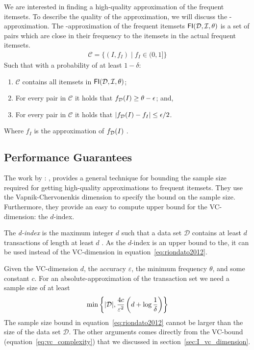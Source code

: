 \documentclass[../main.tex]{subfiles}
\begin{document}
We are interested in finding a high-quality approximation of the frequent itemsets.
To describe the quality of the approximation, we will discuss the \FIapprox-approximation.
The \FIapprox-approximation of the frequent itemsets $\mathsf{FI}(\mathcal{D}, \mathcal{I}, \theta)$ is a set of pairs
which are close in their frequency to the itemsets in the actual frequent itemsets.
\begin{align}
    \mathcal{C} = \{ (I, f_I) \mid f_I \in (0,1] \}
\end{align}
Such that with a probability of at least $1 - \delta$:
\begin{enumerate}[noitemsep]
    \item $\mathcal{C}$ contains all itemsets in $\mathsf{FI}(\mathcal{D}, \mathcal{I}, \theta)$;
    \item For every pair in $\mathcal{C}$ it holds that $f_{\mathcal{D}}(I) \ge \theta - \epsilon$; and,
    \item For every pair in $\mathcal{C}$ it holds that $\lvert f_{\mathcal{D}}(I) - f_I\rvert \le \epsilon/2$.
\end{enumerate}
Where $f_I$ is the approximation of $f_{\mathcal{D}}(I)$
\cite{Riondato2015}.


\subsection{Performance Guarantees}
\label{sec:I_performance_guarantees}

The work by \citeauthor{Riondato2012} \cite{Riondato2012}: ,
provides a general technique for bounding the sample size required for getting high-quality approximations to frequent itemsets.
They use the Vapnik-Chervonenkis dimension to specify the bound on the sample size. 
Furthermore, they provide an easy to compute upper bound for the VC-dimension: the $d$-index.

The \emph{d-index} is the maximum integer $d$ such that a data set $\mathcal{D}$ contains at least $d$ transactions
of length at least $d$ \cite{Riondato2012}.
As the $d$-index is an upper bound to the, it can be used instead of the VC-dimension in equation~\ref{eq:riondato2012}.

Given the VC-dimension $d$, the accuracy $\varepsilon$, the minimum frequency $\theta$, and some constant $c$.
For an absolute-approximation of the transaction set we need a sample size of at least \cite{Riondato2012}
\begin{align}
    \label{eq:riondato2012}
    \min \left\{ \lvert\mathcal{D}\rvert, \frac{4c}{\varepsilon^{2}} \left( d + \log \frac{1}{\delta} \right) \right\}
\end{align}
The sample size bound in equation~\ref{eq:riondato2012} cannot be larger than the size of the data set $\mathcal{D}$.
The other arguments comes directly from the VC-bound (equation~\ref{eq:vc_complexity}) that we discussed in section~\ref{sec:I_vc_dimension}.
\end{document}
